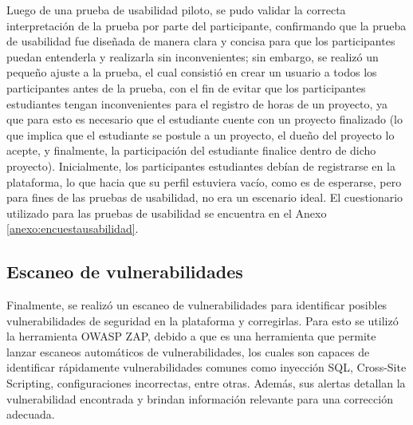 Luego de una prueba de usabilidad piloto, se pudo validar la correcta interpretación de la prueba por parte del participante, confirmando
que la prueba de usabilidad fue diseñada de manera clara y concisa para que los participantes puedan entenderla y realizarla sin inconvenientes;
sin embargo, se realizó un pequeño ajuste a la prueba, el cual consistió en crear un usuario a todos los participantes antes de la prueba,
con el fin de evitar que los participantes estudiantes tengan inconvenientes para el registro de horas de un proyecto, ya que para esto es
necesario que el estudiante cuente con un proyecto finalizado (lo que implica que el estudiante se postule a un proyecto, el dueño del proyecto
lo acepte, y finalmente, la participación del estudiante finalice dentro de dicho proyecto). Inicialmente, los participantes estudiantes debían
de registrarse en la plataforma, lo que hacia que su perfil estuviera vacío, como es de esperarse, pero para fines de las pruebas de usabilidad,
no era un escenario ideal. El cuestionario utilizado para las pruebas de usabilidad se encuentra en el Anexo \ref{anexo:encuestausabilidad}.

\subsection{Escaneo de vulnerabilidades}
Finalmente, se realizó un escaneo de vulnerabilidades para identificar posibles vulnerabilidades de seguridad en la plataforma y corregirlas.
Para esto se utilizó la herramienta OWASP ZAP, debido a que es una herramienta que permite lanzar escaneos automáticos de vulnerabilidades, los
cuales son capaces de identificar rápidamente vulnerabilidades comunes como inyección SQL, Cross-Site Scripting, configuraciones incorrectas,
entre otras. Además, sus alertas detallan la vulnerabilidad encontrada y brindan información relevante para una corrección adecuada.
